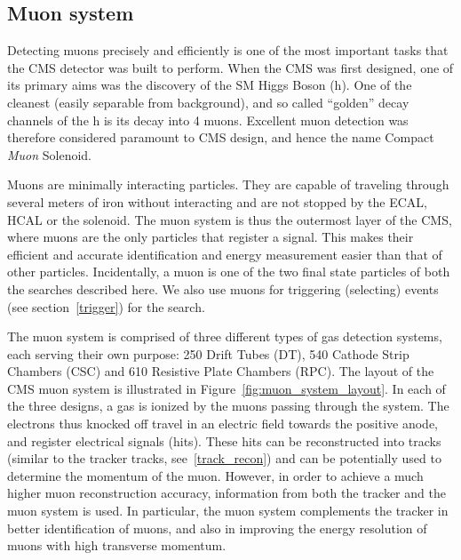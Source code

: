 \subsection{Muon system}
\label{muon_system}
Detecting muons precisely and efficiently is one of the most important tasks that the CMS detector was built to perform. When the CMS was first designed, one of its primary aims was the discovery of the SM Higgs Boson (h). One of the cleanest (easily separable from background), and so called ``golden'' decay channels of the h is its decay into 4 muons. Excellent muon detection was therefore considered paramount to CMS design, and hence the name Compact \textit{Muon} Solenoid.

Muons are minimally interacting particles. They are capable of traveling through several meters of iron without interacting and are not stopped by the ECAL, HCAL or the solenoid. The muon system is thus the outermost layer of the CMS, where muons are the only particles that register a signal. This makes their efficient and accurate identification and energy measurement easier than that of other particles. Incidentally, a muon is one of the two final state particles of both the searches described here. We also use muons for triggering (selecting) events (see section~\ref{trigger}) for the search.

The muon system is comprised of three different types of gas detection systems, each serving their own purpose: 250 Drift Tubes (DT), 540 Cathode Strip Chambers (CSC) and 610 Resistive Plate Chambers (RPC). The layout of the CMS muon system is illustrated in Figure~\ref{fig:muon_system_layout}. In each of the three designs, a gas is ionized by the muons passing through the system. The electrons thus knocked off travel in an electric field towards the positive anode, and register electrical signals (hits). These hits can be reconstructed into tracks (similar to the tracker tracks, see~\ref{track_recon}) and can be potentially used to determine the momentum of the muon. However, in order to achieve a much higher muon reconstruction accuracy, information from both the tracker and the muon system is used. In particular, the muon system complements the tracker in better identification of muons, and also in improving the energy resolution of muons with high transverse momentum.  

